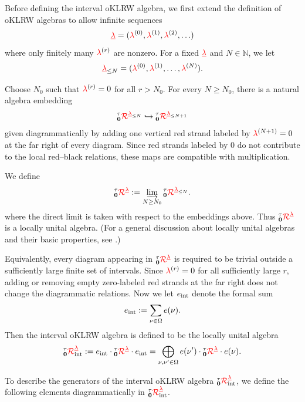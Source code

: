 Before defining the interval oKLRW algebra, we first extend the definition of
oKLRW algebras to allow infinite sequences
\[
    \lamseq=(\rlam^{(0)},\rlam^{(1)},\rlam^{(2)},\ldots)
\]
where only finitely many $\rlam^{(r)}$ are nonzero. For a fixed $\lamseq$ and
$N\in \mathbb N$, we let
\[
    \lamseq_{\leq N}
    =
    (\rlam^{(0)},\rlam^{(1)},\ldots,\rlam^{(N)}).
\]

Choose \(N_0\) such that
\(\rlam^{(r)}=0\) for all \(r>N_0\). For every \(N\geq N_0\), there
is a natural algebra embedding
\[
    \oklrwzero^{\lamseq_{\leq N}}
    \hookrightarrow
    \oklrwzero^{\lamseq_{\leq N+1}}
\]
given diagrammatically by adding one vertical red strand labeled by
\(\rlam^{(N+1)}=0\) at the far right of every diagram. Since red
strands labeled by \(0\) do not contribute to the local red--black
relations, these maps are compatible with multiplication.

We define
\[
    \oklrwzero^{\lamseq}
    :=
    \varinjlim_{N\geq N_0}
    \oklrwzero^{\lamseq_{\leq N}}.
\]
where the direct limit is taken with respect to the embeddings above. Thus
\(\oklrwzero^{\lamseq}\) is a locally unital algebra. (For a general discussion about locally unital algebras and their basic properties, see \cite[Sect. 2.1]{BD17}.) 

Equivalently, every diagram appearing in $\oklrwzero^{\lamseq}$ is required to be trivial outside a sufficiently large finite set of intervals. Since $\rlam^{(r)}=0$ for all sufficiently large $r$, adding or removing empty zero-labeled red strands at the far right does not change the diagrammatic relations. Now we let $\eint$ denote the formal sum 
\begin{gather}
\label{def:eint}
\eint:=\sum_{\nu\in \Omega}e(\nu).
\end{gather}
Then the interval oKLRW algebra is defined to be the locally unital algebra
\begin{gather}
\label{def:intklrwalg}
    \intklrw
    := \eint \cdot \oklrwzero^{\lamseq} \cdot \eint=
    \bigoplus_{\nu,\nu'\in\Omega}
    e(\nu')\cdot \oklrwzero^{\lamseq}\cdot e(\nu).
\end{gather}



To describe the generators of the interval oKLRW algebra $\intklrw$, we define the following elements diagrammatically in $\intklrw$. 

